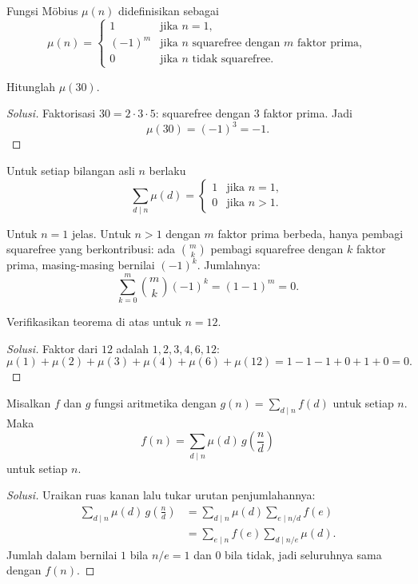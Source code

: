 \documentclass[12pt]{scrartcl}
\begin{document}
\begin{definition}
Fungsi M\"obius $\mu(n)$ didefinisikan sebagai
\[ \mu(n) = \begin{cases}
1 & \text{jika } n = 1, \\
(-1)^m & \text{jika $n$ squarefree dengan $m$ faktor prima}, \\
0 & \text{jika $n$ tidak squarefree}.
\end{cases} \]
\end{definition}

\begin{example}
Hitunglah $\mu(30)$.
\end{example}
\begin{proof}[Solusi]
Faktorisasi $30 = 2 \cdot 3 \cdot 5$: squarefree dengan $3$ faktor prima.
Jadi
\[ \mu(30) = (-1)^3 = -1. \]
\end{proof}

\begin{theorem}
Untuk setiap bilangan asli $n$ berlaku
\[ \sum_{d \mid n} \mu(d) = \begin{cases} 1 & \text{jika } n = 1, \\ 0 & \text{jika } n > 1. \end{cases} \]
\end{theorem}

Untuk $n = 1$ jelas. Untuk $n > 1$ dengan $m$ faktor prima berbeda,
hanya pembagi squarefree yang berkontribusi:
ada $\binom{m}{k}$ pembagi squarefree dengan $k$ faktor prima,
masing-masing bernilai $(-1)^k$. Jumlahnya:
\[ \sum_{k=0}^{m} \binom{m}{k}(-1)^k = (1 - 1)^m = 0. \]

\begin{example}
Verifikasikan teorema di atas untuk $n = 12$.
\end{example}
\begin{proof}[Solusi]
Faktor dari $12$ adalah $1, 2, 3, 4, 6, 12$:
\[ \mu(1) + \mu(2) + \mu(3) + \mu(4) + \mu(6) + \mu(12)
= 1 - 1 - 1 + 0 + 1 + 0 = 0. \]
\end{proof}

\begin{theorem}
Misalkan $f$ dan $g$ fungsi aritmetika dengan $g(n) = \sum_{d \mid n} f(d)$
untuk setiap $n$. Maka
\[ f(n) = \sum_{d \mid n} \mu(d)\, g\left(\frac{n}{d}\right) \]
untuk setiap $n$.
\end{theorem}

\begin{proof}[Solusi]
Uraikan ruas kanan lalu tukar urutan penjumlahannya:
\begin{align*}
\sum_{d \mid n} \mu(d)\, g\left(\frac{n}{d}\right)
&= \sum_{d \mid n} \mu(d) \sum_{e \mid n/d} f(e) \\
&= \sum_{e \mid n} f(e) \sum_{d \mid n/e} \mu(d).
\end{align*}
Jumlah dalam bernilai $1$ bila $n/e = 1$ dan $0$ bila tidak,
jadi seluruhnya sama dengan $f(n)$.
\end{proof}
\end{document}
